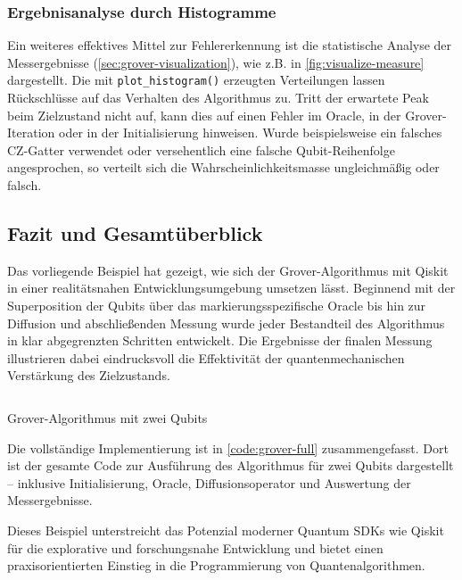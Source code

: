 \subsubsection*{Ergebnisanalyse durch Histogramme}

Ein weiteres effektives Mittel zur Fehlererkennung ist die statistische Analyse der Messergebnisse (\autoref{sec:grover-visualization}), wie z.B. in \autoref{fig:visualize-measure} dargestellt. Die mit \texttt{plot_histogram()} erzeugten Verteilungen lassen Rückschlüsse auf das Verhalten des Algorithmus zu. Tritt der erwartete Peak beim Zielzustand nicht auf, kann dies auf einen Fehler im Oracle, in der Grover-Iteration oder in der Initialisierung hinweisen. Wurde beispielsweise ein falsches CZ-Gatter verwendet oder versehentlich eine falsche Qubit-Reihenfolge angesprochen, so verteilt sich die Wahrscheinlichkeitsmasse ungleichmäßig oder falsch.

\subsection{Fazit und Gesamtüberblick}

Das vorliegende Beispiel hat gezeigt, wie sich der Grover-Algorithmus mit Qiskit in einer realitätsnahen Entwicklungsumgebung umsetzen lässt. Beginnend mit der Superposition der Qubits über das markierungsspezifische Oracle bis hin zur Diffusion und abschließenden Messung wurde jeder Bestandteil des Algorithmus in klar abgegrenzten Schritten entwickelt. Die Ergebnisse der finalen Messung illustrieren dabei eindrucksvoll die Effektivität der quantenmechanischen Verstärkung des Zielzustands.

\begin{listing}[ht!]
  \inputminted{python}{code/quantum-software/grover-full.py}
  \caption{Grover-Algorithmus mit zwei Qubits \autocite{javadi-abhari_grovers_2023}}
  \label{code:grover-full}
\end{listing}

Die vollständige Implementierung ist in \autoref{code:grover-full} zusammengefasst. Dort ist der gesamte Code zur Ausführung des Algorithmus für zwei Qubits dargestellt – inklusive Initialisierung, Oracle, Diffusionsoperator und Auswertung der Messergebnisse.

Dieses Beispiel unterstreicht das Potenzial moderner Quantum SDKs wie Qiskit für die explorative und forschungsnahe Entwicklung und bietet einen praxisorientierten Einstieg in die Programmierung von Quantenalgorithmen.

\clearpage
\printbibliography
